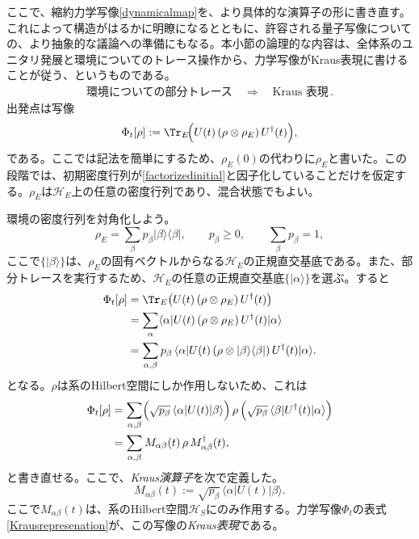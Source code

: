 \documentclass[a4paper,11pt,oneside]{article}
\theoremstyle{definition}
\numberwithin{equation}{section}
\newcommand{\then}{\quad \Rightarrow\quad}
\begin{document}
ここで、縮約力学写像\eqref{dynamicalmap}を、より具体的な演算子の形に書き直す。これによって構造がはるかに明瞭になるとともに、許容される量子写像についての、より抽象的な議論への準備にもなる。本小節の論理的な内容は、全体系のユニタリ発展と環境についてのトレース操作から、力学写像がKraus表現に書けることが従う、というものである。
\begin{align}
\text{環境についての部分トレース} \then \text{Kraus 表現}\,.
\end{align}
出発点は写像
\begin{equation}\label{facto}
\Phi_t[\rho]
:=
\Tr_E\!\Bigl(U(t)\,(\rho\otimes \rho_E)\,U^\dagger(t)\Bigr) ,
\end{equation}
である。ここでは記法を簡単にするため、$\rho_E(0)$の代わりに$\rho_E$と書いた。この段階では、初期密度行列が\eqref{factorizedinitial}と因子化していることだけを仮定する。$\rho_E$は$\mathcal H_E$上の任意の密度行列であり、混合状態でもよい。



環境の密度行列を対角化しよう。
\begin{equation}
\rho_E = \sum_\beta p_\beta |\beta\rangle\langle \beta| ,
\qquad
p_\beta \geq 0,
\qquad
\sum_\beta p_\beta = 1 ,
\end{equation}
ここで$\{|\beta\rangle\}$は、$\rho_E$の固有ベクトルからなる$\mathcal H_E$の正規直交基底である。また、部分トレースを実行するため、$\mathcal H_E$の任意の正規直交基底$\{|\alpha\rangle\}$を選ぶ。すると
\begin{align}
\Phi_t[\rho]
&=
\Tr_E\!\left(U(t)\,(\rho\otimes \rho_E)\,U^\dagger(t)\right)
\nonumber\\
&=
\sum_\alpha
\langle \alpha|
U(t)\,(\rho\otimes \rho_E)\,U^\dagger(t)
|\alpha\rangle
\nonumber\\
&=
\sum_{\alpha,\beta}
p_\beta\,
\langle \alpha|
U(t)\,(\rho\otimes |\beta\rangle\langle\beta|)\,U^\dagger(t)
|\alpha\rangle .
\end{align}
となる。$\rho$は系のHilbert空間にしか作用しないため、これは
\begin{align}
\Phi_t[\rho]
&=
\sum_{\alpha,\beta}
\Bigl(\sqrt{p_\beta}\,\langle \alpha|U(t)|\beta\rangle\Bigr)
\,\rho\,
\Bigl(\sqrt{p_\beta}\,\langle \beta|U^\dagger(t)|\alpha\rangle\Bigr)
\nonumber\\
&=
\sum_{\alpha,\beta}\label{Krausrepresenation}
M_{\alpha\beta}(t)\,\rho\,M_{\alpha\beta}^\dagger(t) ,
\end{align}
と書き直せる。ここで、\textit{Kraus演算子}を次で定義した。
\begin{equation}\label{twoindexkraus}
M_{\alpha\beta}(t)
:=
\sqrt{p_\beta}\,\langle \alpha|U(t)|\beta\rangle .
\end{equation}
ここで$M_{\alpha\beta}(t)$は、系のHilbert空間$\mathcal H_S$にのみ作用する。力学写像$ \Phi_{t}$の表式\eqref{Krausrepresenation}が、この写像の\textit{Kraus表現}である。
\end{document}
